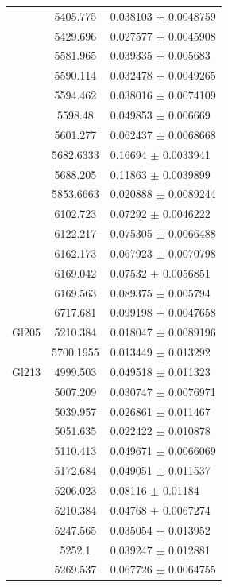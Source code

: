 \begin{longtable}{|c|c|l|}
 & 5405.775 & 0.038103 $\pm$ 0.0048759 \\       
 & 5429.696 & 0.027577 $\pm$ 0.0045908 \\       
 & 5581.965 & 0.039335 $\pm$ 0.005683 \\        
 & 5590.114 & 0.032478 $\pm$ 0.0049265 \\       
 & 5594.462 & 0.038016 $\pm$ 0.0074109 \\       
 & 5598.48 & 0.049853 $\pm$ 0.006669 \\         
 & 5601.277 & 0.062437 $\pm$ 0.0068668 \\       
 & 5682.6333 & 0.16694 $\pm$ 0.0033941 \\       
 & 5688.205 & 0.11863 $\pm$ 0.0039899 \\        
 & 5853.6663 & 0.020888 $\pm$ 0.0089244 \\      
 & 6102.723 & 0.07292 $\pm$ 0.0046222 \\        
 & 6122.217 & 0.075305 $\pm$ 0.0066488 \\       
 & 6162.173 & 0.067923 $\pm$ 0.0070798 \\       
 & 6169.042 & 0.07532 $\pm$ 0.0056851 \\        
 & 6169.563 & 0.089375 $\pm$ 0.005794 \\        
 & 6717.681 & 0.099198 $\pm$ 0.0047658 \\       
\hline                                          
Gl205 & 5210.384 & 0.018047 $\pm$ 0.0089196 \\  
 & 5700.1955 & 0.013449 $\pm$ 0.013292 \\       
\hline                                          
Gl213 & 4999.503 & 0.049518 $\pm$ 0.011323 \\   
 & 5007.209 & 0.030747 $\pm$ 0.0076971 \\       
 & 5039.957 & 0.026861 $\pm$ 0.011467 \\        
 & 5051.635 & 0.022422 $\pm$ 0.010878 \\        
 & 5110.413 & 0.049671 $\pm$ 0.0066069 \\       
 & 5172.684 & 0.049051 $\pm$ 0.011537 \\        
 & 5206.023 & 0.08116 $\pm$ 0.01184 \\          
 & 5210.384 & 0.04768 $\pm$ 0.0067274 \\        
 & 5247.565 & 0.035054 $\pm$ 0.013952 \\        
 & 5252.1 & 0.039247 $\pm$ 0.012881 \\          
 & 5269.537 & 0.067726 $\pm$ 0.0064755 \\       

\end{longtable}
